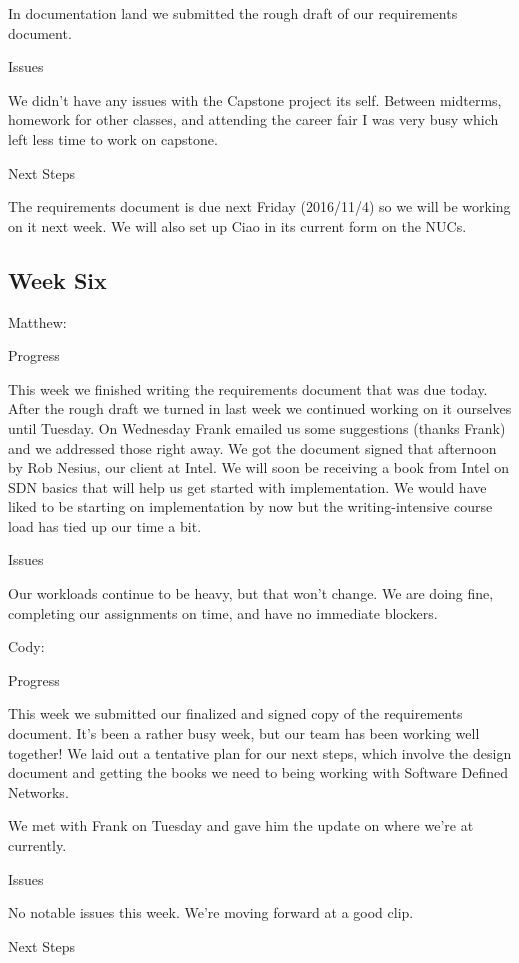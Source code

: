 \documentclass[10pt,onecolumn,journal,draftclsnofoot]{IEEEtran}
\begin{document}
In documentation land we submitted the rough draft of our requirements document.

Issues

We didn't have any issues with the Capstone project its self. Between midterms,
homework for other classes, and attending the career fair I was very busy which
left less time to work on capstone.

Next Steps

The requirements document is due next Friday (2016/11/4) so we will be working
on it next week. We will also set up Ciao in its current form on the NUCs.

\subsection{Week Six}

Matthew:

Progress

This week we finished writing the requirements document that was due today.
After the rough draft we turned in last week we continued working on it
ourselves until Tuesday. On Wednesday Frank emailed us some suggestions (thanks
Frank) and we addressed those right away. We got the document signed that
afternoon by Rob Nesius, our client at Intel. We will soon be receiving a book
from Intel on SDN basics that will help us get started with implementation. We
would have liked to be starting on implementation by now but the
writing-intensive course load has tied up our time a bit.

Issues

Our workloads continue to be heavy, but that won't change. We are doing fine,
completing our assignments on time, and have no immediate blockers.

Cody:

Progress

This week we submitted our finalized and signed copy of the requirements
document. It's been a rather busy week, but our team has been working well
together! We laid out a tentative plan for our next steps, which involve the
design document and getting the books we need to being working with Software
Defined Networks.

We met with Frank on Tuesday and gave him the update on where we're at
currently.

Issues

No notable issues this week. We're moving forward at a good clip.

Next Steps
\end{document}
